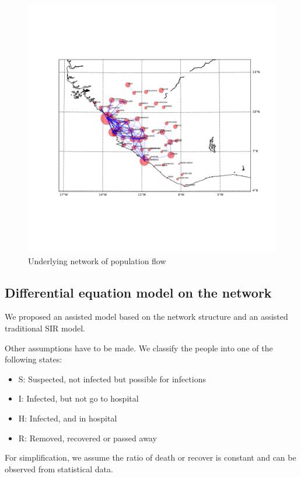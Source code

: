 \documentclass[11pt]{article}
\begin{document}
\begin{figure}[hbt]
\begin{center}
  \includegraphics[width=5in]{graph/network2.pdf}
  \caption{Underlying network of population flow}
  \label{network}
\end{center}  
\end{figure}

\subsection{Differential equation model on the network}

We proposed an assisted model based on the network structure and an assisted traditional SIR model.

Other assumptions have to be made. We classify the people into one of the following states:

\begin{itemize}
    \item S: Suspected, not infected but possible for infections
    \item I: Infected, but not go to hospital
    \item H: Infected, and in hospital
    \item R: Removed, recovered or passed away
\end{itemize}

For simplification, we assume the ratio of death or recover is constant and can be observed from statistical data.
\end{document}
